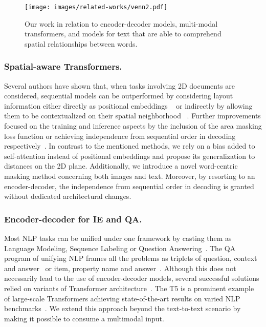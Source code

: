 \documentclass[runningheads]{llncs}
\begin{document}
\begin{figure}[t]
    \centering
    \texttt{[image: images/related-works/venn2.pdf]}
    \caption{Our work in relation to encoder-decoder models, multi-modal transformers, and models for text that are able to comprehend spatial relationships between words.}
    \label{fig:venn}
\end{figure}

\subsubsection{Spatial-aware Transformers.} 
Several authors have shown that, when tasks involving 2D documents are considered, sequential models can be outperformed by considering layout information either directly as positional embeddings ~\cite{ho2019axial,garncarek2020lambert,xu2020layoutlm} or indirectly by allowing them to be contextualized on their spatial neighborhood ~\cite{denk2019bertgrid,yin2020tabert,herzig2020tapas}. 
Further improvements focused on the training and inference aspects by the inclusion of the area masking loss function or achieving independence from sequential order in decoding respectively~\cite{hong2021bros,hwang2020spatial}.
In contrast to the mentioned methods, we rely on a bias added to self-attention instead of positional embeddings and propose its generalization to distances on the 2D plane. Additionally, we introduce a novel word-centric masking method concerning both images and text. 
Moreover, by resorting to an encoder-decoder, the independence from sequential order in decoding is granted without dedicated architectural changes.



\subsubsection{Encoder-decoder for IE and QA.} Most NLP tasks can be unified under one framework by casting them as Language Modeling, Sequence Labeling or Question Answering~\cite{radford2019language,Keskar2019UnifyingQA}. The QA program of unifying NLP frames all the problems as triplets of question, context and answer~\cite{pmlr-v48-kumar16,DBLP:journals/corr/abs-1806-08730,khashabi2020unifiedqa} or item, property name and answer~\cite{hewlett-etal-2016-wikireading}. Although this does not necessarily lead to the use of encoder-decoder models, several successful solutions relied on variants of Transformer architecture~\cite{transformer,lewis-etal-2020-bart,dwojak-etal-2020-dataset,2020t5}. The T5 is a prominent example of large-scale Transformers achieving state-of-the-art results on varied NLP benchmarks~\cite{2020t5}. 
We extend this approach beyond the text-to-text scenario by making it possible to consume a multimodal input.
\end{document}
